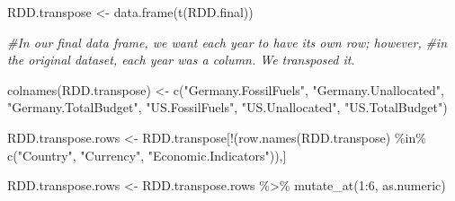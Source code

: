 \documentclass[
  12pt,
]{article}
\newenvironment{Shaded}{\begin{snugshade}}{\end{snugshade}}
\newcommand{\CommentTok}[1]{\textcolor[rgb]{0.56,0.35,0.01}{\textit{#1}}}
\newcommand{\DecValTok}[1]{\textcolor[rgb]{0.00,0.00,0.81}{#1}}
\newcommand{\FunctionTok}[1]{\textcolor[rgb]{0.00,0.00,0.00}{#1}}
\newcommand{\NormalTok}[1]{#1}
\newcommand{\OtherTok}[1]{\textcolor[rgb]{0.56,0.35,0.01}{#1}}
\newcommand{\SpecialCharTok}[1]{\textcolor[rgb]{0.00,0.00,0.00}{#1}}
\newcommand{\StringTok}[1]{\textcolor[rgb]{0.31,0.60,0.02}{#1}}
\begin{document}
\begin{Shaded}
\begin{Highlighting}[]
\NormalTok{RDD.transpose }\OtherTok{\textless{}{-}} \FunctionTok{data.frame}\NormalTok{(}\FunctionTok{t}\NormalTok{(RDD.final))}

\CommentTok{\#In our final data frame, we want each year to have its own row; however, }
\CommentTok{\#in the original dataset, each year was a column. We transposed it.}

\FunctionTok{colnames}\NormalTok{(RDD.transpose) }\OtherTok{\textless{}{-}} \FunctionTok{c}\NormalTok{(}\StringTok{"Germany.FossilFuels"}\NormalTok{, }\StringTok{"Germany.Unallocated"}\NormalTok{, }\StringTok{"Germany.TotalBudget"}\NormalTok{, }\StringTok{"US.FossilFuels"}\NormalTok{, }\StringTok{"US.Unallocated"}\NormalTok{, }\StringTok{"US.TotalBudget"}\NormalTok{)}

\NormalTok{RDD.transpose.rows }\OtherTok{\textless{}{-}}\NormalTok{ RDD.transpose[}\SpecialCharTok{!}\NormalTok{(}\FunctionTok{row.names}\NormalTok{(RDD.transpose) }\SpecialCharTok{\%in\%} \FunctionTok{c}\NormalTok{(}\StringTok{"Country"}\NormalTok{, }\StringTok{"Currency"}\NormalTok{, }\StringTok{"Economic.Indicators"}\NormalTok{)),]}
 
\NormalTok{RDD.transpose.rows }\OtherTok{\textless{}{-}}\NormalTok{ RDD.transpose.rows }\SpecialCharTok{\%\textgreater{}\%}
  \FunctionTok{mutate\_at}\NormalTok{(}\DecValTok{1}\SpecialCharTok{:}\DecValTok{6}\NormalTok{, as.numeric)}



\end{Highlighting}
\end{Shaded}
\end{document}

